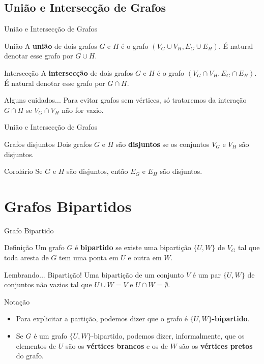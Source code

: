 \documentclass[xcolor=dvipsnames,table]{beamer}
\begin{document}
	\subsection{União e Intersecção de Grafos}
	\begin{frame}{União e Intersecção de Grafos}
		\begin{block}{União}
			A {\bf união} de dois grafos $G$ e $H$ é o grafo $(V_G \cup V_H, E_G \cup E_H)$. É natural denotar esse grafo por $G \cup H$.
		\end{block}
		\begin{block}{Intersecção}
			A {\bf intersecção} de dois grafos $G$ e $H$ é o grafo $(V_G \cap V_H, E_G \cap E_H)$. É natural denotar esse grafo por $G \cap H$.
		\end{block}
		\begin{alertblock}{Alguns cuidados...}
			Para evitar grafos sem vértices, só trataremos da interação $G \cap H$ se $V_G \cap V_H$ não for vazio.
		\end{alertblock}
	\end{frame}
	
	\begin{frame}{União e Intersecção de Grafos}
		\begin{block}{Grafos disjuntos}
			Dois grafos $G$ e $H$ são {\bf disjuntos} se os conjuntos $V_G$ e $V_H$ são disjuntos.
		\end{block}
		\begin{block}{Corolário}
		 	Se $G$ e $H$ são disjuntos, então $E_G$ e $E_H$ são disjuntos.
		\end{block}
	\end{frame}
	
	\section{Grafos Bipartidos}
	\begin{frame}{Grafo Bipartido}
		\begin{block}{Definição}
			Um grafo $G$ é {\bf bipartido} se existe uma bipartição $\{U, W \}$ de $V_G$ tal que toda aresta de $G$ tem uma ponta em $U$ e outra em $W$.
		\end{block} \pause
		\begin{block}{Lembrando... Bipartição!}
			Uma bipartição de um conjunto $V$ é um par $\{U, W\}$ de conjuntos não vazios tal que $U \cup W = V$ e $U \cap W = \emptyset$.
		\end{block} \pause
		\begin{block}{Notação}
			\begin{itemize}
				\item Para explicitar a partição, podemos dizer que o grafo é {\bf $\{ U, W \}$-bipartido}. \pause
				\item Se $G$ é um grafo $\{ U, W \}$-bipartido, podemos dizer, informalmente, que os elementos de $U$ são os {\bf vértices brancos} e os de $W$ são os {\bf vértices pretos} do grafo.
			\end{itemize}
		\end{block} 
	\end{frame}
	
\end{document}
